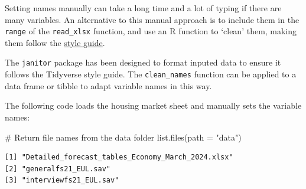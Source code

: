 \documentclass[
  letterpaper,
  DIV=11,
  numbers=noendperiod]{scrreprt}
\newenvironment{Shaded}{\begin{snugshade}}{\end{snugshade}}
\newcommand{\AttributeTok}[1]{\textcolor[rgb]{0.40,0.45,0.13}{#1}}
\newcommand{\CommentTok}[1]{\textcolor[rgb]{0.37,0.37,0.37}{#1}}
\newcommand{\FunctionTok}[1]{\textcolor[rgb]{0.28,0.35,0.67}{#1}}
\newcommand{\NormalTok}[1]{\textcolor[rgb]{0.00,0.23,0.31}{#1}}
\newcommand{\StringTok}[1]{\textcolor[rgb]{0.13,0.47,0.30}{#1}}
\begin{document}
Setting names manually can take a long time and a lot of typing if there
are many variables. An alternative to this manual approach is to include
them in the \texttt{range} of the \texttt{read\_xlsx} function, and use
an R function to `clean' them, making them follow the
\href{https://style.tidyverse.org/index.html}{style guide}.

\begin{tcolorbox}[enhanced jigsaw, bottomrule=.15mm, left=2mm, leftrule=.75mm, bottomtitle=1mm, coltitle=black, colbacktitle=quarto-callout-tip-color!10!white, toptitle=1mm, arc=.35mm, breakable, title=\textcolor{quarto-callout-tip-color}{\faLightbulb}\hspace{0.5em}{Style tip}, rightrule=.15mm, toprule=.15mm, opacityback=0, opacitybacktitle=0.6, titlerule=0mm, colback=white, colframe=quarto-callout-tip-color-frame]

The \texttt{janitor} package has been designed to format inputed data to
ensure it follows the Tidyverse style guide. The \texttt{clean\_names}
function can be applied to a data frame or tibble to adapt variable
names in this way.

\end{tcolorbox}

The following code loads the housing market sheet and manually sets the
variable names:

\begin{Shaded}
\begin{Highlighting}[]
\CommentTok{\# Return file names from the data folder}
\FunctionTok{list.files}\NormalTok{(}\AttributeTok{path =} \StringTok{"data"}\NormalTok{)}
\end{Highlighting}
\end{Shaded}

\begin{verbatim}
[1] "Detailed_forecast_tables_Economy_March_2024.xlsx"
[2] "generalfs21_EUL.sav"                             
[3] "interviewfs21_EUL.sav"                           
\end{verbatim}
\end{document}
